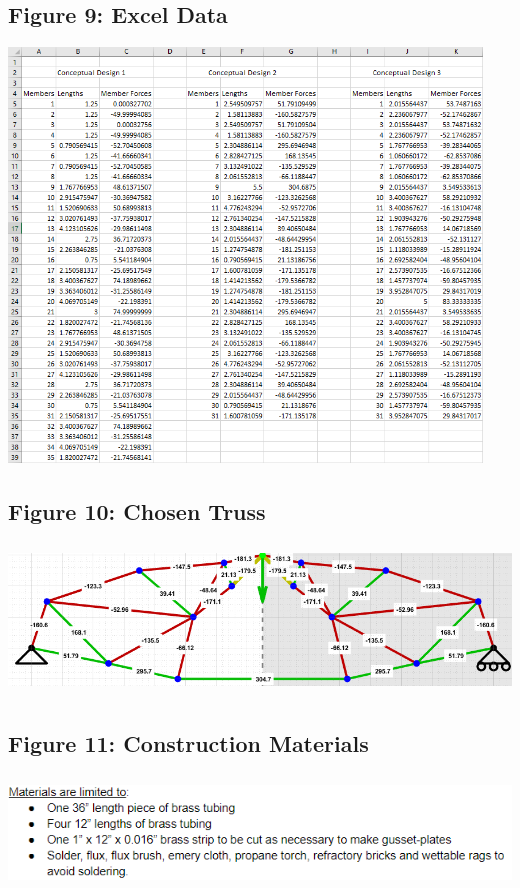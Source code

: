 \documentclass{article}
\begin{document}
\subsection{Figure 9: Excel Data}
\begin{center}{\includegraphics[height=11cm]{TrussExcel.png}}\end{center}

\subsection{Figure 10: Chosen Truss}
\begin{center}{\includegraphics[height=4cm]{TrussDesignWithValues.png}}\end{center}

\subsection{Figure 11: Construction Materials}
\begin{center}{\includegraphics[height=3cm]{ConstructionMaterials.png}}\end{center}
\end{document}
